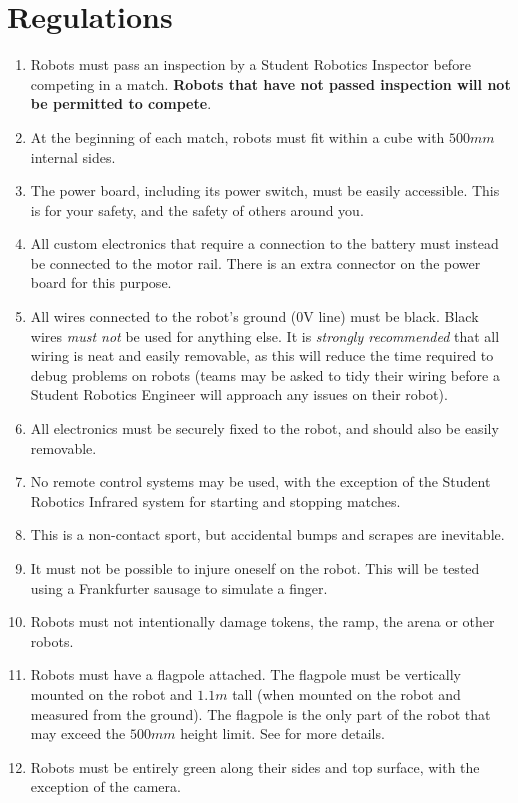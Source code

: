 \section {Regulations}
\label{sec:Regulations}

\begin{enumerate}
\item Robots must pass an inspection by a Student Robotics Inspector before competing in a match.
 \textbf{Robots that have not passed inspection will not be permitted to compete}.
\item At the beginning of each match, robots must fit within a cube with $500mm$ internal sides.
\item The power board, including its power switch, must be easily accessible.
 This is for your safety, and the safety of others around you.
\item All custom electronics that require a connection to the battery must instead be connected to the motor rail.
 There is an extra connector on the power board for this purpose.
\item All wires connected to the robot's ground (0V line) must be black.
 Black wires \emph{must not} be used for anything else.
 It is \emph{strongly recommended} that all wiring is neat and easily removable, as this will reduce the time required to debug problems on robots
  (teams may be asked to tidy their wiring before a Student Robotics Engineer will approach any issues on their robot).
\item All electronics must be securely fixed to the robot, and should also be easily removable.
\item No remote control systems may be used, with the exception of the Student Robotics Infrared system for starting and stopping matches.
\item This is a non-contact sport, but accidental bumps and scrapes are inevitable.
\item It must not be possible to injure oneself on the robot.
 This will be tested using a Frankfurter sausage to simulate a finger.
\item Robots must not intentionally damage tokens, the ramp, the arena or other robots.
\item Robots must have a flagpole attached.
 The flagpole must be vertically mounted on the robot and $1.1m$ tall (when mounted on the robot and measured from the ground).
 The flagpole is the only part of the robot that may exceed the $500mm$ height limit.
 See  for more details.
\item Robots must be entirely green along their sides and top surface, with the exception of the camera.

\end{enumerate}
